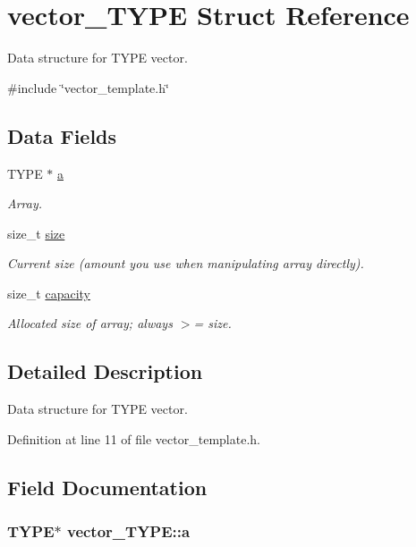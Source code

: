 \hypertarget{structvector___t_y_p_e}{\section{vector\-\_\-\-T\-Y\-P\-E Struct Reference}
\label{structvector___t_y_p_e}
}


Data structure for T\-Y\-P\-E vector.  




{\ttfamily \#include \char`\"{}vector\-\_\-template.\-h\char`\"{}}

\subsection*{Data Fields}
\begin{DoxyCompactItemize}
\item 
T\-Y\-P\-E $\ast$ \hyperlink{structvector___t_y_p_e_a7a2bcca1e061603bab751260e26986e1}{a}
\begin{DoxyCompactList}\small\item\em Array. \end{DoxyCompactList}\item 
size\-\_\-t \hyperlink{structvector___t_y_p_e_a5c187692d3e0d1659d7024a751ec4b4d}{size}
\begin{DoxyCompactList}\small\item\em Current size (amount you use when manipulating array directly). \end{DoxyCompactList}\item 
size\-\_\-t \hyperlink{structvector___t_y_p_e_aa2f337cea7d3cb1e1ed4f5ee5a22678f}{capacity}
\begin{DoxyCompactList}\small\item\em Allocated size of array; always $>$= size. \end{DoxyCompactList}\end{DoxyCompactItemize}


\subsection{Detailed Description}
Data structure for T\-Y\-P\-E vector. 



Definition at line 11 of file vector\-\_\-template.\-h.



\subsection{Field Documentation}
\hypertarget{structvector___t_y_p_e_a7a2bcca1e061603bab751260e26986e1}{
\subsubsection[{a}]{\setlength{\rightskip}{0pt plus 5cm}T\-Y\-P\-E$\ast$ vector\-\_\-\-T\-Y\-P\-E\-::a}}\label{structvector___t_y_p_e_a7a2bcca1e061603bab751260e26986e1}


